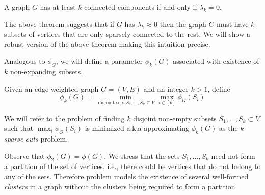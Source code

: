 \documentclass[11pt]{article}
\begin{document}
\begin{theorem} 
	A graph $G$ has at least $k$ connected components if and only
	if $\lambda_k = 0$.
	\label{thm:kdisconnected}
\end{theorem}

The above theorem suggests that if $G$ has $\lambda_k \approx 0$ then
the graph $G$ must have $k$ subsets of vertices that are only
sparsely connected to the rest.  We will show a robust version of the
above theorem making this intuition precise.  

Analogous to $\phi_G$, we will define a parameter $\phi_{k}(G)$
associated with existence of $k$ non-expanding subsets.  

\begin{problem} Given an edge weighted graph $G=(V,E)$ and an integer $k>1$, 
	define
	$$ \phi_k(G) = \min_{ \text{ disjoint sets } S_1, \ldots, S_k
\subseteq V} \max_{i \in [k]} \phi_G(S_i) $$
	
	We will refer to the problem of 
	finding $k$ disjoint non-empty subsets $S_1, \ldots, S_k
	\subset V$ such that $\max_i \phi_G(S_i)$ is minimized a.k.a
	approximating $\phi_k(G)$ as the {\it $k$-sparse cuts} problem.
\end{problem}

Observe that $\phi_2(G) = \phi(G)$.
%
We stress that the sets $S_1,\ldots,S_k$ need not form a partition of the set of vertices, i.e., there could be vertices that do not belong to
any of the sets. 
%
Therefore problem models the existence of several well-formed {\em clusters} in a graph without the clusters being
required to form a partition.
\end{document}
